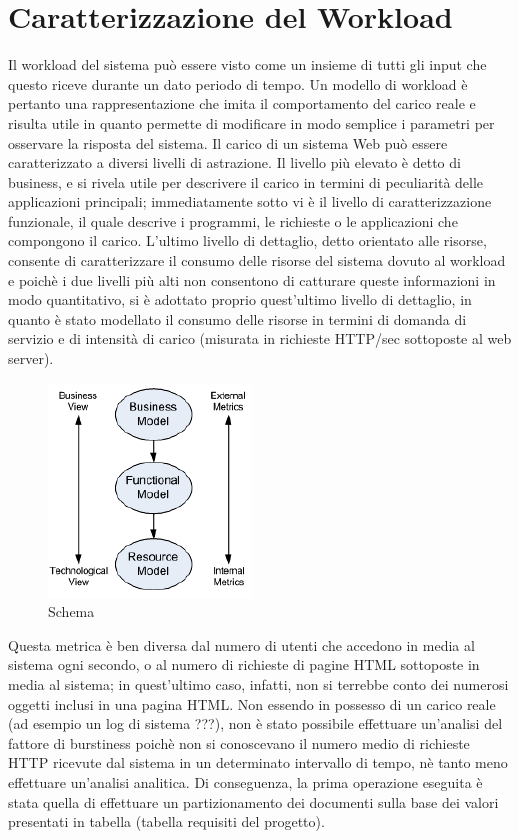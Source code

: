 \chapter{Caratterizzazione del Workload}
Il workload del sistema può essere visto come un insieme di tutti gli input che questo riceve durante un dato periodo di tempo. Un modello di workload è pertanto una rappresentazione che imita il comportamento del carico reale e risulta utile in quanto permette di modificare in modo semplice i parametri per osservare la risposta del sistema. Il carico di un sistema Web può essere caratterizzato a diversi livelli di astrazione. Il livello più elevato è detto di business, e si rivela utile per descrivere il carico in termini di peculiarità delle applicazioni principali; immediatamente sotto vi è il livello di caratterizzazione funzionale, il quale descrive i programmi, le richieste o le applicazioni che compongono il carico. L'ultimo livello di dettaglio, detto orientato alle risorse, consente di caratterizzare il consumo delle risorse del sistema dovuto al workload e poichè i due livelli più alti non consentono di catturare queste informazioni in modo quantitativo, si è adottato proprio quest'ultimo livello di dettaglio, in quanto è stato modellato il consumo delle risorse in termini di domanda di servizio e di intensità di carico (misurata in richieste HTTP/sec sottoposte al web server). 
\begin{figure}[H]
\begin{center}
\includegraphics[scale=0.5]{etc/schema3.png}
\caption{Schema}
\label{schema3}
\end{center}
\end{figure}
Questa metrica è ben diversa dal numero di utenti che accedono in media al sistema ogni secondo, o al numero di richieste di pagine HTML sottoposte in media al sistema; in quest'ultimo caso, infatti, non si terrebbe conto dei numerosi oggetti inclusi in una pagina HTML. 
Non essendo in possesso di un carico reale (ad esempio un log di sistema ???), non è stato possibile effettuare un'analisi del fattore di burstiness poichè non si conoscevano il numero medio di richieste HTTP ricevute dal sistema in un determinato intervallo di tempo, nè tanto meno effettuare un'analisi analitica. Di conseguenza, la prima operazione eseguita è stata quella di effettuare un partizionamento dei documenti sulla base dei valori presentati in tabella (tabella requisiti del progetto). 
